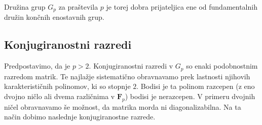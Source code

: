 \documentclass[11pt]{book}
\def\FF{\mathbf{F}}
\theoremstyle{definition}
\theoremstyle{zgled}
\theoremstyle{odprtproblem}
\theoremstyle{domacanaloga}
\theoremstyle{izrek}
\begin{document}
Družina grup $G_p$ za praštevila $p$ je torej dobra prijateljica ene od fundamentalnih družin končnih enostavnih grup.

\subsection{Konjugiranostni razredi}

Predpostavimo, da je $p > 2$. Konjugiranostni razredi v $G_p$ so enaki podobnostnim razredom matrik. Te najlažje sistematično obravnavamo prek lastnosti njihovih karakterističnih polinomov, ki so stopnje $2$. Bodisi je ta polinom razcepen (z eno dvojno ničlo ali dvema različnima v $\FF_p$) bodisi je nerazcepen. V primeru dvojnih ničel obravnavamo še možnost, da matrika morda ni diagonalizabilna. Na ta način dobimo naslednje konjugiranostne razrede.
\end{document}
